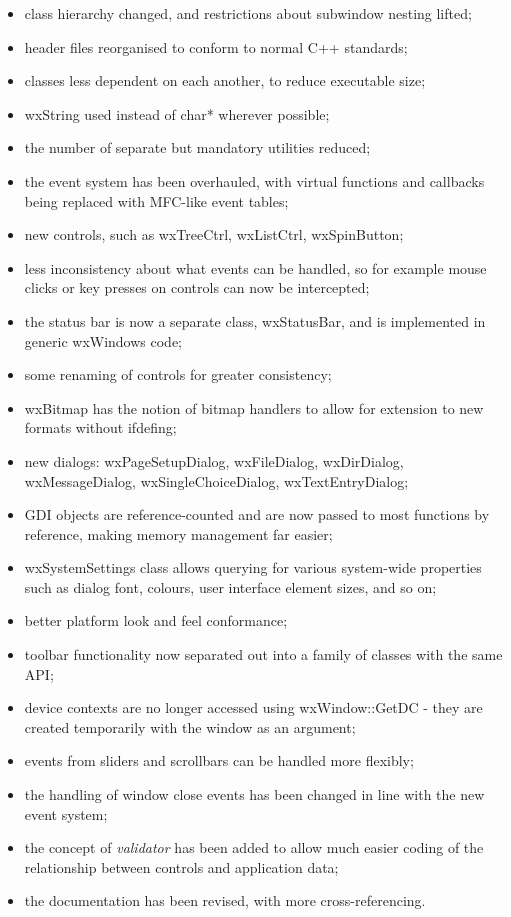 \begin{itemize}\itemsep=0pt
\item class hierarchy changed, and restrictions about subwindow nesting lifted;
\item header files reorganised to conform to normal C++ standards;
\item classes less dependent on each another, to reduce executable size;
\item wxString used instead of char* wherever possible;
\item the number of separate but mandatory utilities reduced;
\item the event system has been overhauled, with
virtual functions and callbacks being replaced with MFC-like event tables;
\item new controls, such as wxTreeCtrl, wxListCtrl, wxSpinButton;
\item less inconsistency about what events can be handled, so for example
mouse clicks or key presses on controls can now be intercepted;
\item the status bar is now a separate class, wxStatusBar, and is
implemented in generic wxWindows code;
\item some renaming of controls for greater consistency;
\item wxBitmap has the notion of bitmap handlers to allow for extension to new formats
without ifdefing;
\item new dialogs: wxPageSetupDialog, wxFileDialog, wxDirDialog,
wxMessageDialog, wxSingleChoiceDialog, wxTextEntryDialog;
\item GDI objects are reference-counted and are now passed to most functions
by reference, making memory management far easier;
\item wxSystemSettings class allows querying for various system-wide properties
such as dialog font, colours, user interface element sizes, and so on;
\item better platform look and feel conformance;
\item toolbar functionality now separated out into a family of classes with the
same API;
\item device contexts are no longer accessed using wxWindow::GetDC - they are created
temporarily with the window as an argument;
\item events from sliders and scrollbars can be handled more flexibly;
\item the handling of window close events has been changed in line with the new
event system;
\item the concept of {\it validator} has been added to allow much easier coding of
the relationship between controls and application data;
\item the documentation has been revised, with more cross-referencing.
\end{itemize}

